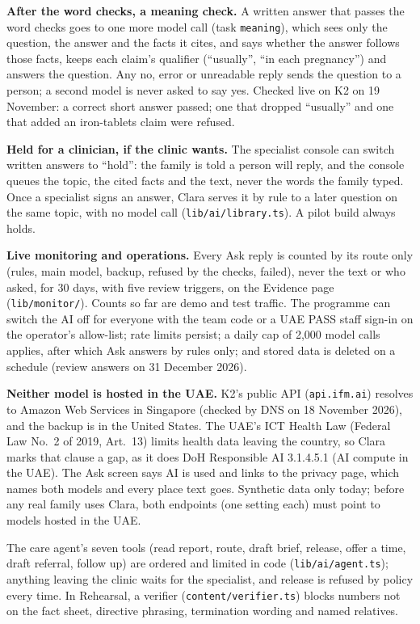 \documentclass[10.5pt,a4paper]{article}
\newcommand{\code}[1]{\texttt{\small #1}}
\newcommand{\file}[1]{\leavevmode\textcolor{muted}{\texttt{\small #1}}}
\begin{document}
\textbf{After the word checks, a meaning check.} A written answer that passes the word checks goes to one more model
call (task \code{meaning}), which sees only the question, the answer and the facts it cites, and says whether the answer
follows those facts, keeps each claim's qualifier (``usually'', ``in each pregnancy'') and answers the question. Any no,
error or unreadable reply sends the question to a person; a second model is never asked to say yes. Checked live on K2
on 19 November: a correct short answer passed; one that dropped ``usually'' and one that added an iron-tablets claim were
refused.

\textbf{Held for a clinician, if the clinic wants.} The specialist console can switch written answers to ``hold'': the
family is told a person will reply, and the console queues the topic, the cited facts and the text, never the words the
family typed. Once a specialist signs an answer, Clara serves it by rule to a later question on the same topic, with no
model call (\file{lib/ai/library.ts}). A pilot build always holds.

\textbf{Live monitoring and operations.} Every Ask reply is counted by its route only (rules, main model, backup, refused
by the checks, failed), never the text or who asked, for 30 days, with five review triggers, on the Evidence page
(\file{lib/monitor/}). Counts so far are demo and test traffic. The programme can switch the AI off for everyone with
the team code or a UAE PASS staff sign-in on the operator's allow-list; rate limits persist; a daily cap of 2,000 model calls applies, after which Ask answers by rules only; and
stored data is deleted on a schedule (review answers on 31 December 2026).

\textbf{Neither model is hosted in the UAE.} K2's public API (\code{api.ifm.ai}) resolves to Amazon Web Services in
Singapore (checked by DNS on 18 November 2026), and the backup is in the United States. The UAE's ICT Health Law
(Federal Law No.~2 of 2019, Art.~13) limits health data leaving the country, so Clara marks that clause a gap, as it
does DoH Responsible AI 3.1.4.5.1 (AI compute in the UAE). The Ask screen says AI is used and links to the privacy
page, which names both models and every place text goes. Synthetic data only today; before any real family uses Clara,
both endpoints (one setting each) must point to models hosted in the UAE.

The care agent's seven tools (read report, route, draft brief, release, offer a time, draft referral, follow up) are
ordered and limited in code (\file{lib/ai/agent.ts}); anything leaving the clinic waits for the specialist, and release
is refused by policy every time. In Rehearsal, a verifier (\file{content/verifier.ts}) blocks numbers not on the fact
sheet, directive phrasing, termination wording and named relatives.
\end{document}
